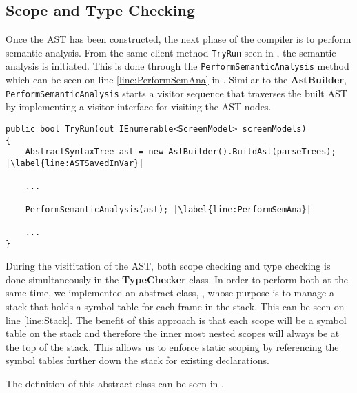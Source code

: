 \subsection*{Scope and Type Checking} \label{sec:TypeChecker}
Once the AST has been constructed, the next phase of the compiler is to perform semantic analysis. From the same client method \texttt{TryRun} seen in , the semantic analysis is initiated. This is done through the \texttt{PerformSemanticAnalysis} method which can be seen on line \ref{line:PerformSemAna} in .
Similar to the \textbf{AstBuilder}, \texttt{PerformSemanticAnalysis} starts a visitor sequence that traverses the built AST by implementing a visitor interface for visiting the AST nodes.

\begin{lstlisting}[language=CSharp, caption={The Run method that serves as a client inside the DazelCompiler class}, label={lst:RunMethodSecond},escapechar=|]
public bool TryRun(out IEnumerable<ScreenModel> screenModels)
{
    AbstractSyntaxTree ast = new AstBuilder().BuildAst(parseTrees); |\label{line:ASTSavedInVar}|

    ...
    
    PerformSemanticAnalysis(ast); |\label{line:PerformSemAna}|

    ...
}
\end{lstlisting}

During the visititation of the AST, both scope checking and type checking is done simultaneously in the \textbf{TypeChecker} class. 
In order to perform both at the same time, we implemented an abstract class, \abstractsemanticclass{}, whose purpose is to manage a stack that holds a symbol table for each frame in the stack. This can be seen on line \ref{line:Stack}. The benefit of this approach is that each scope will be a symbol table on the stack and therefore the inner most nested scopes will always be at the top of the stack. This allows us to enforce static scoping by referencing the symbol tables further down the stack for existing declarations.

The definition of this abstract class can be seen in .

